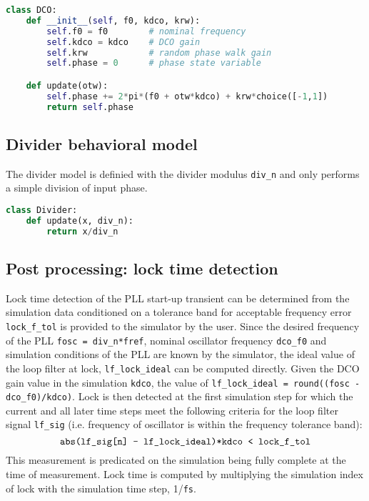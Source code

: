 \begin{lstlisting}[language={Python}, caption={DCO behavioral model.}, label={dco_code}]
class DCO:
	def __init__(self, f0, kdco, krw):
		self.f0 = f0		# nominal frequency
		self.kdco = kdco 	# DCO gain
		self.krw			# random phase walk gain
		self.phase = 0		# phase state variable

	def update(otw):
		self.phase += 2*pi*(f0 + otw*kdco) + krw*choice([-1,1])
		return self.phase
   \end{lstlisting}

\subsection{Divider behavioral model}
The divider model is definied with the divider modulus \texttt{div\_n} and only performs a simple division of input phase. 
\begin{lstlisting}[language={Python}, caption={Divider behavioral model.}, label={div_code}]
class Divider:
	def update(x, div_n):
		return x/div_n
\end{lstlisting}

\subsection{Post processing: lock time detection}
Lock time detection of the PLL start-up transient can be determined from the simulation data conditioned on a tolerance band for acceptable frequency error \texttt{lock\_f\_tol} is provided to the simulator by the user. Since the desired frequency of the PLL \texttt{fosc = div\_n*fref}, nominal oscillator frequency \texttt{dco\_f0} and simulation conditions of the PLL are known by the simulator, the ideal value of the loop filter at lock, \texttt{lf\_lock\_ideal} can be computed directly. Given the DCO gain value in the simulation \texttt{kdco}, the value of \texttt{lf\_lock\_ideal = round((fosc - dco\_f0)/kdco)}. Lock is then detected at the first simulation step for which the current and all later time steps meet the following criteria for the loop filter signal \texttt{lf\_sig} (i.e. frequency of oscillator is within the frequency tolerance band):
\begin{equation}
\text{\texttt{abs(lf\_sig[n] - lf\_lock\_ideal)*kdco < lock\_f\_tol}}
\end{equation}
This measurement is predicated on the simulation being fully complete at the time of measurement. Lock time is computed by multiplying the simulation index of lock with the simulation time step, 1/\texttt{fs}.

